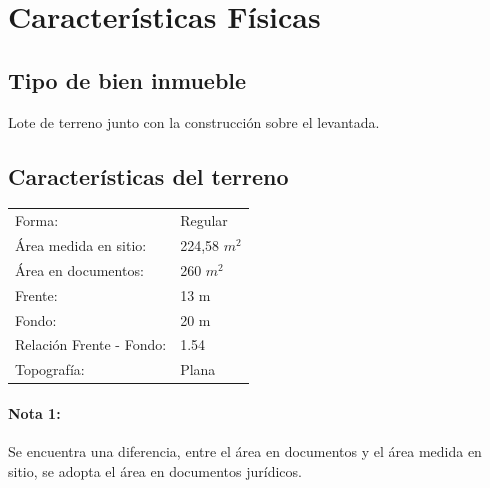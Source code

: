 \documentclass[12pt,a4paper,twoside]{article}
\begin{document}
%

\section{Características Físicas}

\subsection{Tipo de bien inmueble}

Lote de terreno junto con la construcción sobre el levantada.

\subsection{Características del terreno}


\begin{tabular}{ l l }
   
   
    Forma: & Regular\\
   Área medida en sitio: & 224,58 $m^{2}$\\
   Área en documentos: & 260 $m^{2}$\\
   Frente: & 13 m\\
  Fondo: & 20 m\\
   Relación Frente - Fondo: & 1.54\\
   Topografía: & Plana\\
   
\end{tabular}

\paragraph{Nota 1:} Se encuentra una diferencia, entre el área en documentos y el área medida en sitio, se adopta el área en documentos jurídicos.

\end{document}

